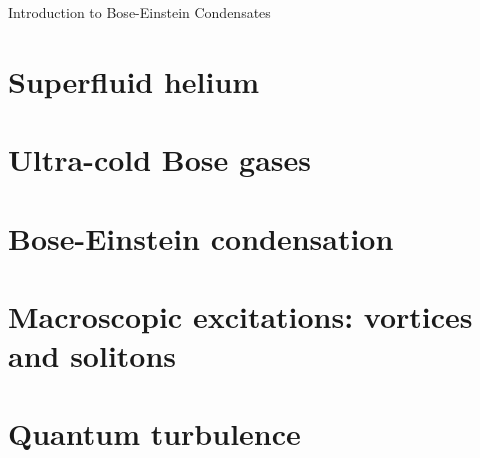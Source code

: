 \begin{chapter}{\label{cha:bose_gasses}Introduction to Bose-Einstein Condensates}
\section{Superfluid helium}
\section{Ultra-cold Bose gases}
\section{Bose-Einstein condensation}
\section{Macroscopic excitations: vortices and solitons}
\section{Quantum turbulence}
\end{chapter}